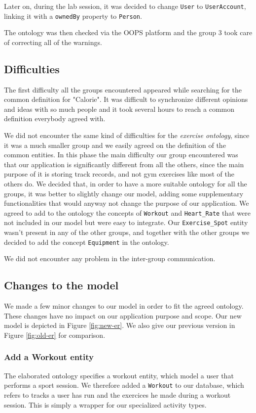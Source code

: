 \documentclass[a4paper]{article}
\begin{document}
Later on, during the lab session, it was decided to change \texttt{User} to \texttt{UserAccount}, linking it with a \texttt{ownedBy} property to \texttt{Person}.

The ontology was then checked via the OOPS platform and the group 3 took care of correcting all of the warnings. 

\subsection{Difficulties}
The first difficulty all the groups encountered appeared while searching for the common definition for "Calorie". It was difficult to synchronize different opinions and ideas with so much people and it took several hours to reach a common definition everybody agreed with.

We did not encounter the same kind of difficulties for the \textit{exercise ontology}, since it was a much smaller group and we easily agreed on the definition of the common entities.
In this phase the main difficulty our group encountered was that our application is significantly different from all the others, since the main purpose of it is storing track records, and not gym exercises like most of the others do.
We decided that, in order to have a more suitable ontology for all the groups, it was better to slightly change our model, adding some supplementary functionalities that would anyway not change the purpose of our application. 
We agreed to add to the ontology the concepts of \texttt{Workout} and \texttt{Heart\_Rate} that were not included in our model but were easy to integrate.
Our \texttt{Exercise\_Spot} entity wasn't present in any of the other groups, and together with the other groups we decided to add the concept \texttt{Equipment} in the ontology.

We did not encounter any problem in the inter-group communication. 

\subsection{Changes to the model}
We made a few minor changes to our model in order to fit the agreed ontology. These changes have no impact on our application purpose and scope. Our new model is depicted in Figure \ref{fig:new-er}. We also give our previous version in Figure \ref{fig:old-er} for comparison.

\subsubsection{Add a Workout entity}
The elaborated ontology specifies a workout entity, which model a user that performs a sport session. We therefore added a \texttt{Workout} to our database, which refers to tracks a user has run and the exercices he made during a workout session. This is simply a wrapper for our specialized activity types.
\end{document}
